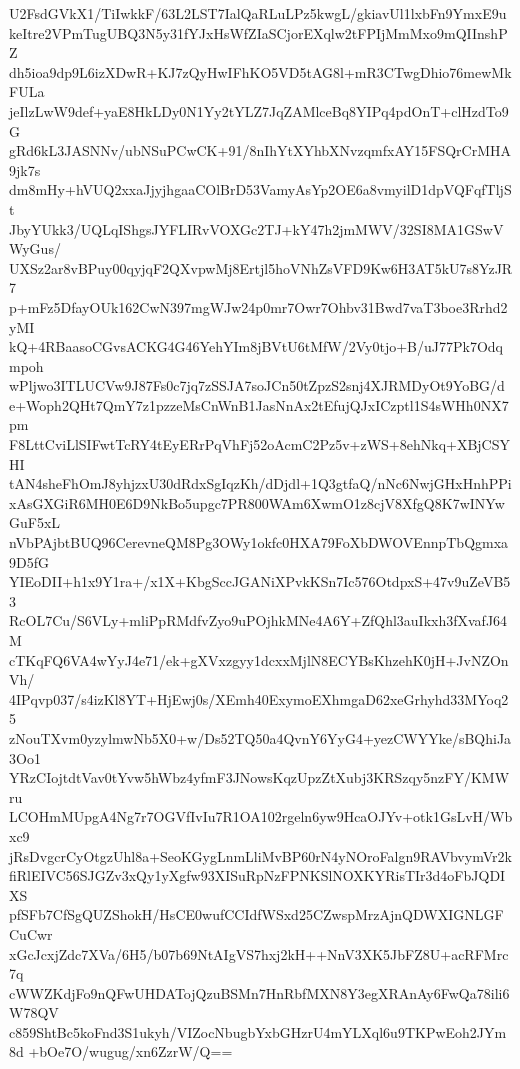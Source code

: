 U2FsdGVkX1/TiIwkkF/63L2LST7IalQaRLuLPz5kwgL/gkiavUl1lxbFn9YmxE9u
keItre2VPmTugUBQ3N5y31fYJxHsWfZIaSCjorEXqlw2tFPIjMmMxo9mQIInshPZ
dh5ioa9dp9L6izXDwR+KJ7zQyHwIFhKO5VD5tAG8l+mR3CTwgDhio76mewMkFULa
jeIlzLwW9def+yaE8HkLDy0N1Yy2tYLZ7JqZAMlceBq8YIPq4pdOnT+clHzdTo9G
gRd6kL3JASNNv/ubNSuPCwCK+91/8nIhYtXYhbXNvzqmfxAY15FSQrCrMHA9jk7s
dm8mHy+hVUQ2xxaJjyjhgaaCOlBrD53VamyAsYp2OE6a8vmyilD1dpVQFqfTljSt
JbyYUkk3/UQLqIShgsJYFLIRvVOXGc2TJ+kY47h2jmMWV/32SI8MA1GSwVWyGus/
UXSz2ar8vBPuy00qyjqF2QXvpwMj8Ertjl5hoVNhZsVFD9Kw6H3AT5kU7s8YzJR7
p+mFz5DfayOUk162CwN397mgWJw24p0mr7Owr7Ohbv31Bwd7vaT3boe3Rrhd2yMI
kQ+4RBaasoCGvsACKG4G46YehYIm8jBVtU6tMfW/2Vy0tjo+B/uJ77Pk7Odqmpoh
wPljwo3ITLUCVw9J87Fs0c7jq7zSSJA7soJCn50tZpzS2snj4XJRMDyOt9YoBG/d
e+Woph2QHt7QmY7z1pzzeMsCnWnB1JasNnAx2tEfujQJxICzptl1S4sWHh0NX7pm
F8LttCviLlSIFwtTcRY4tEyERrPqVhFj52oAcmC2Pz5v+zWS+8ehNkq+XBjCSYHI
tAN4sheFhOmJ8yhjzxU30dRdxSgIqzKh/dDjdl+1Q3gtfaQ/nNc6NwjGHxHnhPPi
xAsGXGiR6MH0E6D9NkBo5upgc7PR800WAm6XwmO1z8cjV8XfgQ8K7wINYwGuF5xL
nVbPAjbtBUQ96CerevneQM8Pg3OWy1okfc0HXA79FoXbDWOVEnnpTbQgmxa9D5fG
YIEoDII+h1x9Y1ra+/x1X+KbgSccJGANiXPvkKSn7Ic576OtdpxS+47v9uZeVB53
RcOL7Cu/S6VLy+mliPpRMdfvZyo9uPOjhkMNe4A6Y+ZfQhl3auIkxh3fXvafJ64M
cTKqFQ6VA4wYyJ4e71/ek+gXVxzgyy1dcxxMjlN8ECYBsKhzehK0jH+JvNZOnVh/
4IPqvp037/s4izKl8YT+HjEwj0s/XEmh40ExymoEXhmgaD62xeGrhyhd33MYoq25
zNouTXvm0yzylmwNb5X0+w/Ds52TQ50a4QvnY6YyG4+yezCWYYke/sBQhiJa3Oo1
YRzCIojtdtVav0tYvw5hWbz4yfmF3JNowsKqzUpzZtXubj3KRSzqy5nzFY/KMWru
LCOHmMUpgA4Ng7r7OGVfIvIu7R1OA102rgeln6yw9HcaOJYv+otk1GsLvH/Wbxc9
jRsDvgcrCyOtgzUhl8a+SeoKGygLnmLliMvBP60rN4yNOroFalgn9RAVbvymVr2k
fiRlEIVC56SJGZv3xQy1yXgfw93XISuRpNzFPNKSlNOXKYRisTIr3d4oFbJQDIXS
pfSFb7CfSgQUZShokH/HsCE0wufCCIdfWSxd25CZwspMrzAjnQDWXIGNLGFCuCwr
xGcJcxjZdc7XVa/6H5/b07b69NtAIgVS7hxj2kH++NnV3XK5JbFZ8U+acRFMrc7q
cWWZKdjFo9nQFwUHDATojQzuBSMn7HnRbfMXN8Y3egXRAnAy6FwQa78ili6W78QV
c859ShtBc5koFnd3S1ukyh/VIZocNbugbYxbGHzrU4mYLXql6u9TKPwEoh2JYm8d
+bOe7O/wugug/xn6ZzrW/Q==
